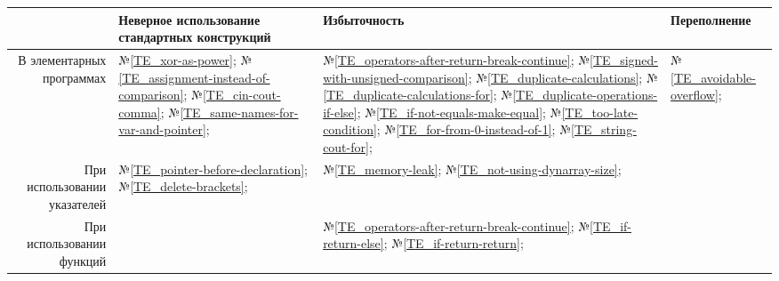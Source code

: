 \begin{center}
	\begin{tabular}{|r|m{4.5cm}|m{4cm}|m{4cm}|}\hline
		 & Неверное использование стандартных конструкций & Избыточность & Переполнение
		\\\hline
			В элементарных программах
		& 
			№\ref{TE_xor-as-power};
			№\ref{TE_assignment-instead-of-comparison};
			№\ref{TE_cin-cout-comma};
			№\ref{TE_same-names-for-var-and-pointer};
		&
			№\ref{TE_operators-after-return-break-continue}; %
			№\ref{TE_signed-with-unsigned-comparison};
			№\ref{TE_duplicate-calculations};
			№\ref{TE_duplicate-calculations-for};
			№\ref{TE_duplicate-operations-if-else};
			№\ref{TE_if-not-equals-make-equal};
			№\ref{TE_too-late-condition};
			№\ref{TE_for-from-0-instead-of-1};
			№\ref{TE_string-cout-for};
		&
			№\ref{TE_avoidable-overflow};
		\\\hline
			При использовании указателей
		&
			№\ref{TE_pointer-before-declaration};
			№\ref{TE_delete-brackets};
		&
			№\ref{TE_memory-leak};
			№\ref{TE_not-using-dynarray-size};
		&
		\\\hline
		При использовании функций
		&
		&
			№\ref{TE_operators-after-return-break-continue}; %
			№\ref{TE_if-return-else};
			№\ref{TE_if-return-return};
		&
		\\\hline
	\end{tabular}
\end{center}
